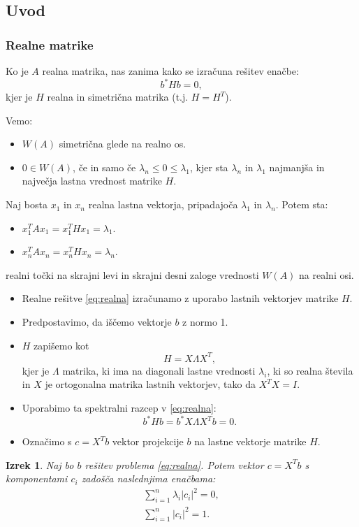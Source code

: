 \documentclass{beamer}
\newcommand{\abs}[1]{ \left\lvert#1\right\rvert}
\newtheorem{izrek}{Izrek}
\begin{document}
\subsection{Uvod}
\begin{frame}
\frametitle{Realne matrike}
\begin{block}{}
Ko je $A$ realna matrika, nas zanima kako se izračuna rešitev enačbe:
\begin{equation}\label{eq:realna}
b^\ast Hb=0,
\end{equation}
kjer je $H$ realna in simetrična matrika (t.j. $H=H^T$).
\end{block}\pause
Vemo:
\begin{itemize}
\item $W(A)$ simetrična glede na realno os.
\item $0 \in W(A)$, če in samo če $\lambda_n\le0\le\lambda_1$, kjer sta $\lambda_n$ in $\lambda_1$ najmanjša in največja lastna vrednost matrike $H$.
\end{itemize}
\end{frame}
\begin{frame}
Naj bosta $x_1$ in $x_n$ realna lastna vektorja, pripadajoča $\lambda_1$ in $\lambda_n$. Potem sta:
\begin{itemize}
\item $x_1^T Ax_1=x_1^T Hx_1=\lambda_1$.
\item $x_n^T Ax_n=x_n^T Hx_n=\lambda_n$.
\end{itemize}
realni točki na skrajni levi in skrajni desni zaloge vrednosti $W(A)$ na realni osi.
\begin{itemize}\pause
\item Realne rešitve \eqref{eq:realna} izračunamo z uporabo lastnih vektorjev matrike $H$. 
\item Predpostavimo, da iščemo vektorje $b$ z normo 1.
\item $H$ zapišemo kot $$H=X\Lambda X^T,$$ kjer je $\Lambda$ matrika, ki ima na diagonali lastne vrednosti $\lambda_i$, ki so realna števila in $X$ je ortogonalna matrika lastnih vektorjev, tako da $X^T X=I$.
\end{itemize}
\end{frame}
\begin{frame}
\begin{itemize}
\item Uporabimo ta spektralni razcep v \eqref{eq:realna}: $$b^\ast Hb=b^\ast X\Lambda X^T b=0.$$ 
\item  Označimo s $c=X^Tb$ vektor projekcije $b$ na lastne vektorje matrike $H$. 
\end{itemize}\pause
\begin{izrek} \label{izrek2}
Naj bo $b$ rešitev problema \eqref{eq:realna}. Potem vektor $c=X^T b$ s komponentami $c_i$ zadošča naslednjima enačbama:
\begin{align}
\sum_{i=1}^{n} \lambda_i \abs{c_i}^2=0 \label{eq:en1},\\
\sum_{i=1}^{n}\abs{c_i}^2=1. \label{eq:en2}
\end{align}
\end{izrek}
\end{frame}
\end{document}
